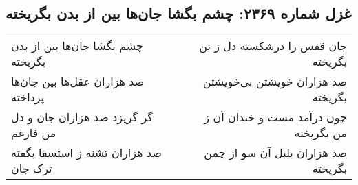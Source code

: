 \begin{center}
\section*{غزل شماره ۲۳۶۹: چشم بگشا جان‌ها بین از بدن بگریخته}
\label{sec:2369}
\begin{longtable}{l p{0.5cm} r}
چشم بگشا جان‌ها بین از بدن بگریخته
&&
جان قفس را درشکسته دل ز تن بگریخته
\\
صد هزاران عقل‌ها بین جان‌ها پرداخته
&&
صد هزاران خویشتن بی‌خویشتن بگریخته
\\
گر گریزد صد هزاران جان و دل من فارغم
&&
چون درآمد مست و خندان آن ز من بگریخته
\\
صد هزاران تشنه ز استسقا بگفته ترک جان
&&
صد هزاران بلبل آن سو از چمن بگریخته
\\
\end{longtable}
\end{center}

